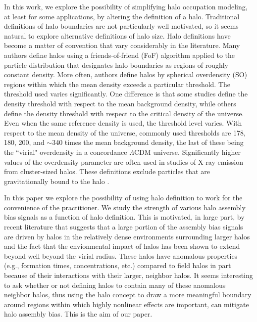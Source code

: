 \documentclass[usenatbib]{mnras}
\begin{document}
In this work, we explore the possibility of simplifying halo occupation modeling, at least for some 
applications, by altering the definition of a halo. Traditional definitions of halo boundaries are 
not particularly well motivated, so it seems natural to explore alternative definitions of halo size. 
Halo definitions have become a matter of convention that vary considerably in the literature. Many 
authors define halos using a friends-of-friend (FoF) algorithm applied to the particle distribution that designates 
halo boundaries as regions of roughly constant density. More often, authors define halos by spherical 
overdensity (SO) regions within which the mean density exceeds a particular threshold. The threshold used 
varies significantly. One difference is that some studies define the density threshold with respect to the 
mean background density, while others define the density threshold with respect to the critical density of 
the universe. Even when the same reference density is used, the threshold level varies. With respect to the 
mean density of the universe, commonly used thresholds are 178, 180, 200, and $\sim$340 times the mean 
background density, the last of these being the ``virial" overdensity in a concordance $\Lambda$CDM universe. 
Significantly higher values of the overdensity parameter are often used in studies of X-ray emission from cluster-sized halos. 
These definitions exclude particles that are gravitationally bound to the halo \citep{kazantzidis_etal06, valluri_etal07, more_etal15}. 


In this paper we explore the possibility of using halo definition to work for the 
convenience of the practitioner. We study the strength of various halo assembly bias signals 
as a function of halo definition. This is motivated, in large part, by recent literature that suggests 
that a large portion of the assembly bias signals are driven by halos in the relatively dense environments 
surrounding larger halos \citep{wang_etal07, warnick_etal08, more_etal15} and the fact
that the envionmental impact of halos has been shown to extend beyond well beyond the virial radius. \citep{adhikari_etal14, diemer_kravtsov14, wetzel_etal14, more_etal15, wetzel_nagai15} 
These halos have anomalous properties (e.g., formation times, concentrations, etc.) compared to field halos 
in part because of their interactions with their larger, neighbor halos. It seems interesting to ask whether or 
not defining halos to contain many of these anomalous neighbor halos, thus using the halo concept to draw a 
more meaningful boundary around regions within which highly nonlinear effects are important, can mitigate 
halo assembly bias. This is the aim of our paper. 
\end{document}
